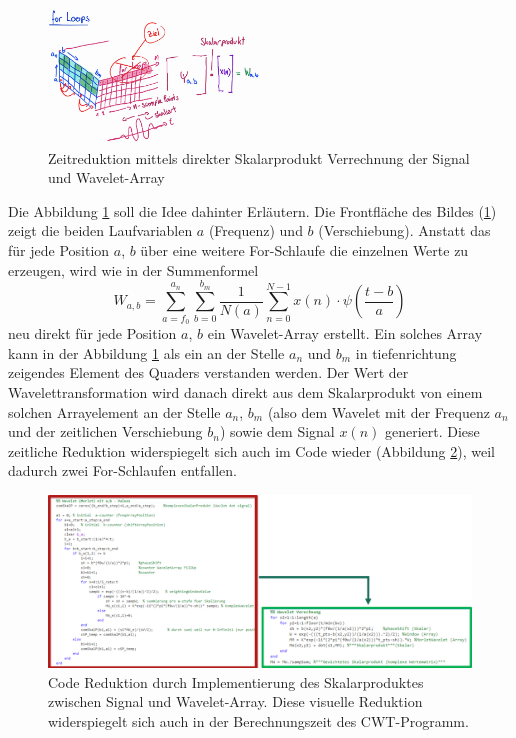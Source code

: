 \begin{figure}
	\centering
	\includegraphics[width=0.5\textwidth]{papers/wavelets/images/14-1_EliminationForLoops.png}
	\caption{Zeitreduktion mittels direkter Skalarprodukt Verrechnung der Signal und Wavelet-Array}
	\label{wavelet:fig:EliminationForLoops}
\end{figure}

Die Abbildung \ref{wavelet:fig:EliminationForLoops} soll die Idee dahinter Erläutern. Die Frontfläche des Bildes (\ref{wavelet:fig:EliminationForLoops}) zeigt die beiden Laufvariablen $a$ (Frequenz) und $b$ (Verschiebung). Anstatt das für jede Position $a$, $b$ über eine weitere For-Schlaufe die einzelnen Werte zu erzeugen, wird wie in der Summenformel \[W_{a,b}=\sum_{a=f_0}^{a_n}\sum_{b=0}^{b_m}\frac{1}{N(a)}\sum_{n=0}^{N-1} x(n)\cdot\psi\left(\frac{t-b}{a}\right)\] neu direkt für jede Position $a$, $b$ ein Wavelet-Array erstellt. Ein solches Array kann in der Abbildung \ref{wavelet:fig:EliminationForLoops} als ein an der Stelle $a_n$ und $b_m$ in tiefenrichtung zeigendes Element des Quaders verstanden werden. Der Wert der Wavelettransformation wird danach direkt aus dem Skalarprodukt von einem solchen Arrayelement an der Stelle $a_n$, $b_m$ (also dem Wavelet mit der Frequenz $a_n$ und der zeitlichen Verschiebung $b_n$) sowie dem Signal $x(n)$ generiert.
Diese zeitliche Reduktion widerspiegelt sich auch im Code wieder (Abbildung \ref{wavelet:fig:EliminationForLoopCode}), weil dadurch zwei For-Schlaufen entfallen.

\begin{figure}
	\centering
	\includegraphics[width=\textwidth]{papers/wavelets/images/14-2_CodeSkalarProd.png}
	\caption{Code Reduktion durch Implementierung des Skalarproduktes zwischen Signal und Wavelet-Array. Diese visuelle Reduktion widerspiegelt sich auch in der Berechnungszeit des CWT-Programm.}
	\label{wavelet:fig:EliminationForLoopCode}
\end{figure}

